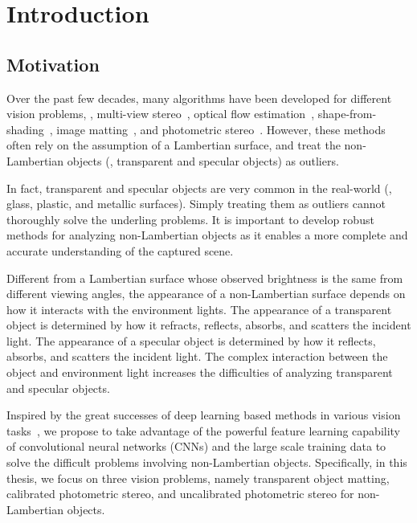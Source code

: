 
\chapter{Introduction}
\label{ch:intro}

\section{Motivation}
Over the past few decades, many algorithms have been developed for different vision problems, \eg, multi-view stereo~\cite{seitz2006comparison,agarwal2011building}, optical flow estimation~\cite{brox2004high,sun2014quantitative}, shape-from-shading~\cite{ikeuchi1981numerical,zhang1999shape}, image matting~\cite{smith1996blue,levin2007closed}, and photometric stereo~\cite{woodham1980ps,hayakawa1994photometric}.
However, these methods often rely on the assumption of a Lambertian surface, and treat the non-Lambertian objects (\eg, transparent and specular objects) as outliers. 

In fact, transparent and specular objects are very common in the real-world (\eg, glass, plastic, and metallic surfaces).
Simply treating them as outliers cannot thoroughly solve the underling problems.
It is important to develop robust methods for analyzing non-Lambertian objects as it enables a more complete and accurate understanding of the captured scene.

Different from a Lambertian surface whose observed brightness is the same from different viewing angles, the appearance of a non-Lambertian surface depends on how it interacts with the environment lights.
The appearance of a transparent object is determined by how it refracts, reflects, absorbs, and scatters the incident light. 
The appearance of a specular object is determined by how it reflects, absorbs, and scatters the incident light.
The complex interaction between the object and environment light increases the difficulties of analyzing transparent and specular objects.

Inspired by the great successes of deep learning based methods in various vision tasks~\cite{lecun1998gradient,krizhevsky2012imagenet,he2016deep}, we propose to take advantage of the powerful feature learning capability of convolutional neural networks (CNNs) and the large scale training data to solve the difficult problems involving non-Lambertian objects.
Specifically, in this thesis, we focus on three vision problems, namely transparent object matting, calibrated photometric stereo, and uncalibrated photometric stereo for non-Lambertian objects.

